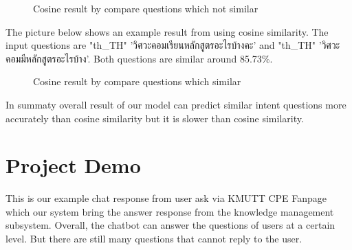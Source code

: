 \documentclass[12pt,oneside,openright,a4paper]{cpe-english-project}
\begin{document}
\begin{figure}[!h]\centering
{}
\caption{Cosine result by compare questions which not similar}\label{fig:Cosine result by compare questions which not similar}
\end{figure}

The picture below shows an example result from using cosine similarity. The input questions are
{
\XeTeXlinebreaklocale "th_TH"	
\thaifont 
'วิศวะคอมเรียนหลักสูตรอะไรบ้างคะ' }
and
{
\XeTeXlinebreaklocale "th_TH"	
\thaifont 
 'วิศวะคอมมีหลักสูตรอะไรบ้าง'. 
}Both questions are similar around 85.73\%.
\begin{figure}[!h]\centering
{}
\caption{Cosine result by compare questions which similar}\label{fig:Cosine result by compare questions which similar}
\end{figure}

In summaty overall result of our model can predict similar intent questions more accurately than cosine similarity but it is slower than cosine similarity.

\pagebreak
\section{Project Demo}
\label{ch4_project_demo}
This is our example chat response from user ask via KMUTT CPE Fanpage which our system bring the answer response from the knowledge management subsystem. Overall, the chatbot can answer the questions of users at a certain level. But there are still many questions that cannot reply to the user.
\end{document}
